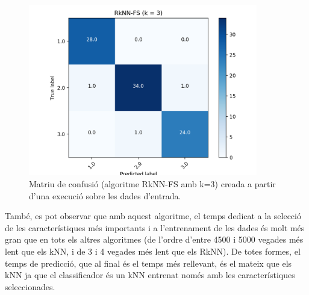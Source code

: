 \documentclass{article} %
\begin{document}
{	\begin{figure}[H]
		\includegraphics[width=10cm]{r3nn_fs}
		\centering
		\color{blue}
		\caption{Matriu de confusió (algoritme RkNN-FS amb k=3) creada a partir d'una execució sobre les dades d'entrada.}\label{visina8}
	\end{figure}

	També, es pot observar que amb aquest algoritme, el temps dedicat a la selecció de les característiques més importants i a l'entrenament de les dades és molt més gran que en tots els altres algoritmes (de l'ordre d'entre 4500 i 5000 vegades més lent que els kNN, i de 3 i 4 vegades més lent que els RkNN). De totes formes, el temps de predicció, que al final és el temps més rellevant, és el mateix que els kNN ja que el classificador és un kNN entrenat només amb les característiques seleccionades.
}
\end{document}
